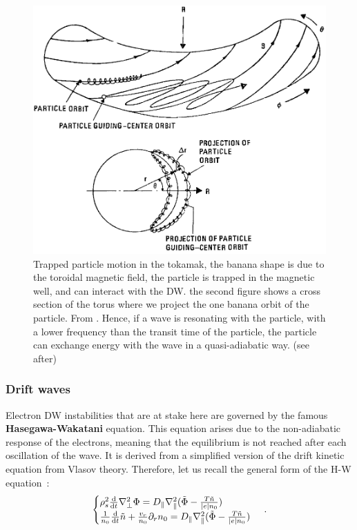 \documentclass[11pt,a4paper,openany]{report}
\begin{document}
\begin{multicols}{2}

    \begin{figure}[H]
        \centering
        \includegraphics[width=1\linewidth]{./figures/banana.png}
        \caption{Trapped particle motion in the tokamak, the banana shape is due to the toroidal magnetic field, the particle is trapped in the magnetic well, and can interact with the DW. the second figure shows a cross section of the torus where we project the one banana orbit of the particle. From \cite{book_banana,Banana_distr_runaway}. Hence, if a wave is resonating with the particle, with a lower frequency than the transit time of the particle, the particle can exchange energy with the wave in a quasi-adiabatic way. (see after)}
        \label{}
    \end{figure}


    \subsubsection{Drift waves}
    Electron DW instabilities that are at stake here are governed by the famous \textbf{Hasegawa-Wakatani} \cite{Hasegawa,Wakatani} equation. This equation arises due to the non-adiabatic response of the electrons, meaning that the equilibrium is not reached after each oscillation of the wave. It is derived from a simplified version of the drift kinetic equation from Vlasov theory. Therefore, let us recall the general form of the H-W equation~:
    \begin{equation}
        \begin{cases}
            \rho_s^2
            \dv{t}\nabla_\perp^2 \Phi= D_\parallel\nabla_\parallel^2(\tilde{\Phi} - \frac{T\tilde{n}}{|e|n_0}) \\
            \frac{1}{n_0}\dv{t}\tilde{n} + \frac{v_r}{n_0}\partial_r n_0 = D_\parallel\nabla_\parallel^2(\tilde{\Phi} - \frac{T\tilde{n}}{|e|n_0})
        \end{cases}\,.
    \end{equation}


\end{multicols}
\end{document}
